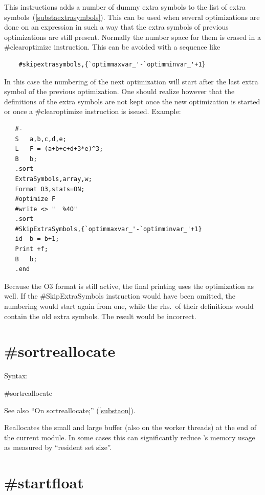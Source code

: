 \noindent This instructions adds a number of dummy extra 
symbols to the list of extra 
symbols~(\ref{substaextrasymbols}). This can be used when several 
optimizations are done on an expression in such a way that the extra 
symbols of previous optimizations are still present. Normally the number 
space for them is erased in a \#clearoptimize instruction. This can be 
avoided with a sequence like
\begin{verbatim}
	#skipextrasymbols,{`optimmaxvar_'-`optimminvar_'+1}
\end{verbatim}
In this case the numbering of the next optimization will start after the 
last extra symbol of the previous optimization.
One should realize however that the definitions of the extra symbols are 
not kept once the new optimization is started or once a \#clearoptimize 
instruction is issued. Example:
\begin{verbatim}
   #-
   S   a,b,c,d,e;
   L   F = (a+b+c+d+3*e)^3;
   B   b;
   .sort
   ExtraSymbols,array,w;
   Format O3,stats=ON;
   #optimize F
   #write <> "  %4O"
   .sort
   #SkipExtraSymbols,{`optimmaxvar_'-`optimminvar_'+1}
   id  b = b+1;
   Print +f;
   B   b;
   .end
\end{verbatim}
Because the O3 format is still active, the final printing uses the 
optimization as well. If the \#SkipExtraSymbols instruction would have been 
omitted, the numbering would start again from one, while the rhs.\ of their 
definitions would contain the old extra symbols. The result would be 
incorrect.


\section{\#sortreallocate}
\label{presortreallocate}

\noindent Syntax:

\#sortreallocate

\noindent See also ``On sortreallocate;'' (\ref{substaon}).

\noindent Reallocates the small and large buffer (also on the worker threads)
at the end of the current module. In some cases this can significantly reduce
\FORM's memory usage as measured by ``resident set size''.


\section{\#startfloat}
\label{prestartfloat}

